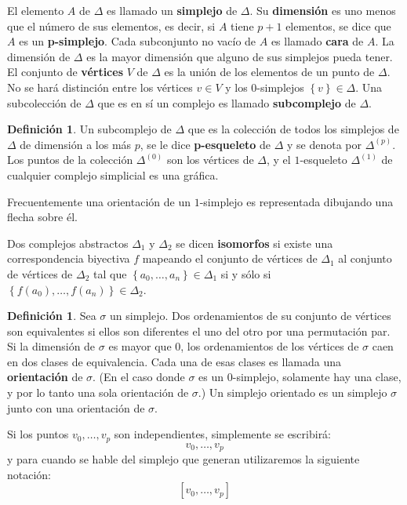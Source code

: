 \documentclass[12pt]{book}
\theoremstyle{definition}
\newtheorem{definition}[theorem]{Definición}
\newcounter{in}
\newcounter{ini}
\begin{document}
El elemento $A$ de $\Delta$ es llamado un \textbf{simplejo}
de $\Delta$. Su \textbf{dimensión} es uno menos que el número
de sus elementos, es decir, si $A$ tiene $p+1$ elementos, se dice que
$A$ es un \textbf{p-simplejo}. Cada subconjunto no vacío de
$A$ es llamado \textbf{cara} de $A$.  La dimensión de $\Delta$
  es la mayor dimensión que alguno de sus simplejos pueda tener. El
  conjunto de \textbf{vértices} $V$ de $\Delta$ es la unión
  de los elementos de un punto de $\Delta$. No se hará distinción
  entre los vértices $v \in V$ y los $0$-simplejos
  $\left\{ v \right\} \in \Delta$. Una subcolección de $\Delta$ que es
  en sí un complejo es llamado \textbf{subcomplejo} de
    $\Delta$.

\begin{definition}
  \label{psk}
  Un subcomplejo de $\Delta$ que es la colección de todos los
  simplejos de $\Delta$ de dimensión a los más $p$, se le dice
  \textbf{p-esqueleto} de $\Delta$ y se denota por
  $\Delta^{(p)}$. Los puntos de la colección $\Delta^{(0)}$ son los
  vértices de $\Delta$, y el $1$-esqueleto $\Delta^{(1)}$ de cualquier
  complejo simplicial es una gráfica.
\end{definition}

Frecuentemente una orientación de un $1$-simplejo es representada
dibujando una flecha sobre él.

Dos complejos abstractos $\Delta_{1}$ y $\Delta_{2}$ se dicen
\textbf{isomorfos} si existe una correspondencia biyectiva
$f$ mapeando el conjunto de vértices de $\Delta_{1}$ al conjunto de
vértices de $\Delta_{2}$ tal que
$\left\{ a_{0}, \ldots, a_{n} \right\} \in \Delta_{1}$ si y sólo si
$\left\{ f(a_{0}), \ldots, f(a_{n}) \right\} \in \Delta_{2}$.
\begin{definition}
  \label{v_s} 
  Sea $\sigma$ un simplejo. Dos ordenamientos de su
  conjunto de vértices son equivalentes si ellos son diferentes el uno
  del otro por una permutación par. Si la dimensión de $\sigma$ es
  mayor que $0$, los ordenamientos de los vértices de $\sigma$ caen en
  dos clases de equivalencia. Cada una de esas clases es llamada una
  \textbf{orientación} de $\sigma$. (En el caso donde $\sigma$ es un
  $0$-simplejo, solamente hay una clase, y por lo tanto una sola
  orientación de $\sigma$.) Un simplejo orientado es un simplejo
  $\sigma$ junto con una orientación de $\sigma$.
\end{definition}

Si los puntos $v_{0}, \ldots, v_{p}$ son independientes, simplemente
se escribirá:
\begin{equation}
  \label{eq:86} v_{0}, \ldots, v_{p}
\end{equation}
y para cuando se hable del simplejo que generan utilizaremos la
siguiente notación:
\begin{equation}
  \left [ \label{eq:86} v_{0}, \ldots, v_{p} \right ]
\end{equation}
\end{document}
